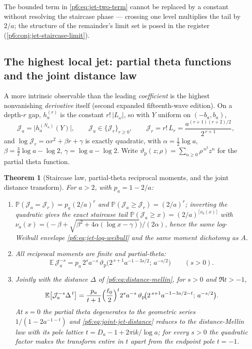 \documentclass[11pt,oneside]{article}
\numberwithin{equation}{section}
\newtheorem{theorem}{Theorem}[section]
\theoremstyle{definition}
\theoremstyle{remark}
\newcommand{\E}{\mathbb E}
\newcommand{\Prob}{\mathbb P}
\newcommand{\ii}{\mathrm i}
\begin{document}
The bounded term in \eqref{p6:eq:jet-two-term} cannot be replaced by a
constant without resolving the staircase phase --- crossing one level
multiplies the tail by $2/a$; the structure of the remainder's limit set
is posed in the register (\cref{p6:conj:jet-staircase-limit}).

\subsection{The highest local jet: partial theta functions and the joint
distance law}

A more intrinsic observable than the leading \emph{coefficient} is the
highest nonvanishing \emph{derivative} itself (second expanded
fifteenth-wave edition).  On a depth-$r$ gap, $h_a^{(r)}$ is the constant
$r!\,|L_\omega|$, so with $Y$ uniform on $(-b_a,b_a)$,
\[
 \mathcal J_a=\bigl|h_a^{(N_a)}(Y)\bigr|,
 \qquad
 \mathcal J_a\in\{\mathcal J_r\}_{r\ge0},
 \qquad
 \mathcal J_r=r!\,L_r=\frac{a^{(r+1)(r+2)/2}}{2^{\,r+1}},
\]
and $\log\mathcal J_r=\alpha r^2+\beta r+\gamma$ is exactly quadratic,
with $\alpha=\tfrac12\log a$, $\beta=\tfrac32\log a-\log2$,
$\gamma=\log a-\log2$.  Write
$\vartheta_{\mathrm p}(z;\rho)=\sum_{n\ge0}\rho^{\,n^2}z^n$ for the
partial theta function.

\begin{theorem}[Staircase law, partial-theta reciprocal moments, and the
joint distance transform]\label{p6:thm:highest-jet}
For $a>2$, with $p_a=1-2/a$:
\begin{enumerate}
\item $\Prob(\mathcal J_a=\mathcal J_r)=p_a(2/a)^r$ and
$\Prob(\mathcal J_a\ge\mathcal J_r)=(2/a)^r$; inverting the quadratic
gives the exact staircase tail
$\Prob(\mathcal J_a\ge x)=(2/a)^{\lceil\nu_a(x)\rceil}$ with
$\nu_a(x)=\bigl(-\beta+\sqrt{\beta^2+4\alpha(\log x-\gamma)}\bigr)/
(2\alpha)$, hence the same log-Weibull envelope
\eqref{p6:eq:jet-log-weibull} and the same moment dichotomy as $A$.
\item All reciprocal moments are finite and partial-theta:
\begin{equation}\label{p6:eq:highest-jet-ptheta}
 \boxed{\ \E\,\mathcal J_a^{-s}
 =p_a\,2^{s}a^{-s}\,
 \vartheta_{\mathrm p}\!\bigl(2^{\,s+1}a^{-1-3s/2};\,a^{-s/2}\bigr)
 \qquad(s>0).\ }
\end{equation}
\item Jointly with the distance $\Delta$ of
\eqref{p6:eq:distance-mellin}, for $s>0$ and $\Re t>-1$,
\begin{equation}\label{p6:eq:joint-jet-distance}
 \E\bigl[\mathcal J_a^{-s}\Delta^{\,t}\bigr]
 =\frac{p_a}{t+1}\Bigl(\frac{\ell_0}2\Bigr)^{t}2^{s}a^{-s}\,
 \vartheta_{\mathrm p}\!\bigl(2^{\,s+1}a^{-1-3s/2-t};\,a^{-s/2}\bigr).
\end{equation}
At $s=0$ the partial theta degenerates to the geometric series
$1/(1-2a^{-1-t})$ and \eqref{p6:eq:joint-jet-distance} reduces to the
distance-Mellin law with its pole lattice
$t=D_a-1+2\pi\ii k/\log a$; for every $s>0$ the quadratic factor makes
the transform entire in $t$ apart from the endpoint pole $t=-1$.
\end{enumerate}
\end{theorem}
\end{document}
